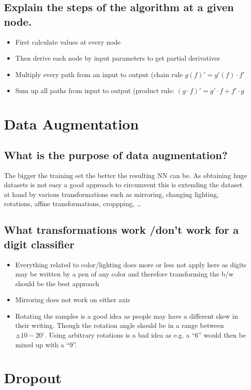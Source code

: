 \subsection{Explain the steps of the algorithm at a given node.}
\begin{itemize}
\item { First calculate values at every node}
\item{ Then derive each node by input parameters to get partial derivatives}
\item{ Multiply every path from an input to output (chain rule $g(f)' = g'(f)\cdot f'$}
\item { Sum up all paths from input to output (product rule: $(g\cdot f)' = g'\cdot f + f'\cdot g$}
\end{itemize}
%
\section{Data Augmentation}
\subsection{What is the purpose of data augmentation?}
The bigger the training set the better the resulting NN can be. As obtaining huge datasets is not easy a good approach to circumvent this is extending the dataset at hand by various transformations such as mirroring, changing lighting, rotations, affine transformations, croppping, \ldots
\subsection{What transformations work /don't work for a digit classifier}
\begin{itemize}
\item Everything related to color/lighting does more or less not apply here as digits may be written by a pen of any color and therefore transforming the b/w should be the best approach
\item Mirroring does not work on either axis
\item Rotating the samples is a good idea as people may have a different skew in their writing. Though the rotation angle should be in a range between $\pm 10-20^\circ$. Using arbitrary rotations is a bad idea as e.g. a ``6'' would then be mixed up with a ``9''.
\end{itemize}
%
\section{Dropout}
